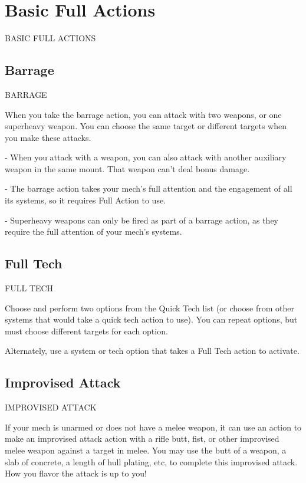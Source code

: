 \section{Basic Full Actions}BASIC FULL ACTIONS  
\subsection{Barrage}
                                               BARRAGE  

When you take the barrage action, you can attack with two weapons, or one superheavy  
weapon. You can choose the same target or different targets when you make these attacks.
 
        	- When you attack with a weapon, you can also attack with another auxiliary weapon in  
        the same mount. That weapon can’t deal bonus damage.
 
        	- The barrage action takes your mech’s full attention and the engagement of all its  
        systems, so it requires Full Action to use. 
 
        	- Superheavy weapons can only be fired as part of a barrage action, as they require the  
        full attention of your mech’s systems.  
\subsection{Full Tech}
                                              FULL TECH  

Choose and perform two options from the Quick Tech list (or choose from other systems that  
would take a quick tech action to use). You can repeat options, but must choose different targets  
for each option.
 

Alternately, use a system or tech option that takes a Full Tech action to activate.
 \subsection{Improvised Attack}

                                      IMPROVISED ATTACK  

If your mech is unarmed or does not have a melee weapon, it can use an action to make an  
improvised attack action with a rifle butt, fist, or other improvised melee weapon against a target  
in melee. You may use the butt of a weapon, a slab of concrete, a length of hull plating, etc, to  
complete this improvised attack. How you flavor the attack is up to you!
 


